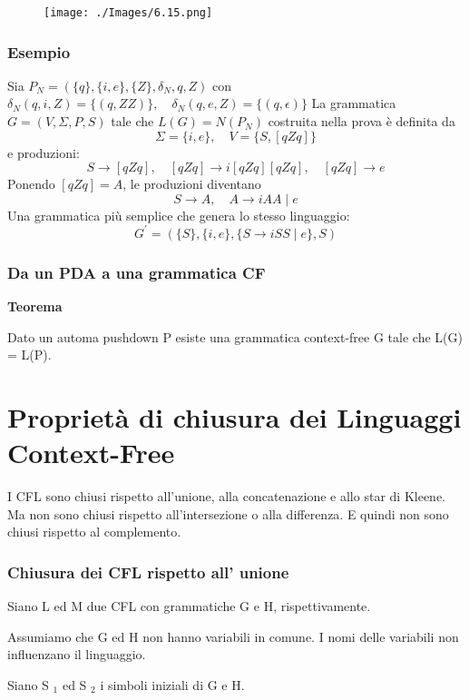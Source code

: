 \begin{figure}[hbpt!]
    \centering
    \texttt{[image: ./Images/6.15.png]}
\end{figure}
\FloatBarrier

\subsubsection{Esempio}

Sia $P_{N}=\left(\{q\},\{i, e\},\{Z\}, \delta_{N}, q, Z\right)$ con $\delta_{N}(q, i, Z)=\{(q, Z Z)\}, \quad \delta_{N}(q, e, Z)=\{(q, \epsilon)\}$
La grammatica $G=(V, \Sigma, P, S)$ tale che $L(G)=N\left(P_{N}\right)$ costruita nella prova è definita da
$$
\Sigma=\{i, e\}, \quad V=\{S,[q Z q]\}
$$
e produzioni:
$$
S \rightarrow[q Z q], \quad[q Z q] \rightarrow i[q Z q][q Z q], \quad[q Z q] \rightarrow e
$$
Ponendo $[q Z q]=A$, le produzioni diventano
$$
S \rightarrow A, \quad A \rightarrow i A A \mid e
$$
Una grammatica più semplice che genera lo stesso linguaggio:
$$
G^{\prime}=(\{S\},\{i, e\},\{S \rightarrow i S S \mid e\}, S)
$$

\subsubsection{Da un PDA a una grammatica CF}

\textbf{Teorema}

Dato un automa pushdown P esiste una grammatica context-free
G tale che L(G) = L(P).

\section{Proprietà di chiusura dei Linguaggi Context-Free}

I CFL sono chiusi rispetto all'unione, alla concatenazione e allo star di Kleene.
Ma non sono chiusi rispetto all'intersezione o alla differenza. E quindi non sono chiusi rispetto al complemento.

\subsubsection{Chiusura dei CFL rispetto all'
unione}

Siano L ed M due CFL con grammatiche
$\mathrm{G}$ e H, rispettivamente.

Assumiamo che G ed H non hanno
variabili in comune. I nomi delle variabili non influenzano il
linguaggio.

Siano S $_{1}$ ed S $_{2}$ i simboli iniziali di G e H.

